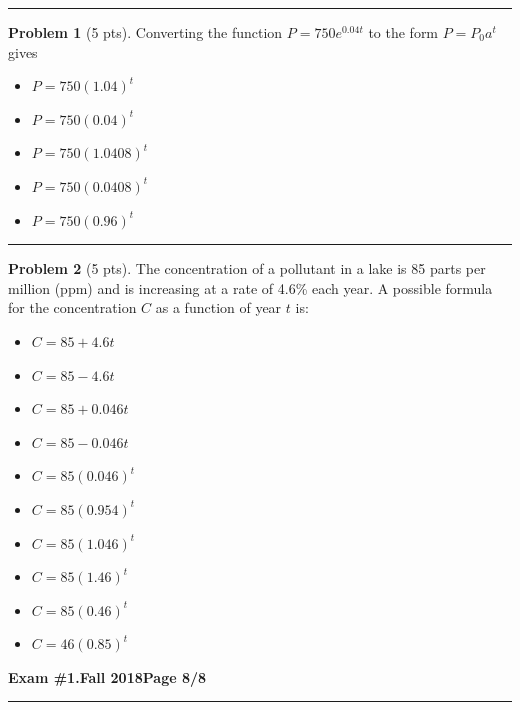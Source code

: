 \documentclass[12pt]{article}
\makeatletter
\theoremstyle{definition}
\newtheorem{problem}{Problem}
\newcommand*{\radiobutton}{%
  \@ifstar{\@radiobutton0}{\@radiobutton1}%
}
\newcommand*{\@radiobutton}[1]{%
  \begin{tikzpicture}
    \pgfmathsetlengthmacro\radius{height("X")/2}
    \draw[radius=\radius] circle;
    \ifcase#1 \fill[radius=.6*\radius] circle;\fi
  \end{tikzpicture}%
}
\makeatother
\begin{document}
\hrule

\begin{problem}[5 pts]
  Converting the function $P = 750e^{0.04t}$ to the form $P = P_0a^t$ gives
  \begin{itemize}
  \item[\radiobutton] $P = 750 (1.04)^t$
  \item[\radiobutton] $P = 750 (0.04)^t$
  \item[\radiobutton] $P = 750 (1.0408)^t$
  \item[\radiobutton] $P = 750 (0.0408)^t$
  \item[\radiobutton] $P = 750 (0.96)^t$
  \end{itemize}
\end{problem}
\hrule

\begin{problem}[5 pts]
  The concentration of a pollutant in a lake is 85 parts per million (ppm) and is increasing at a rate of 4.6\% each
  year. A possible formula for the concentration $C$ as a function of year $t$ is: 
  \begin{itemize}
  \item[\radiobutton] $C = 85 + 4.6t$
  \item[\radiobutton] $C = 85 - 4.6t$
  \item[\radiobutton] $C = 85 + 0.046t$
  \item[\radiobutton] $C = 85 - 0.046t$
  \item[\radiobutton] $C = 85(0.046)^t$
  \item[\radiobutton] $C = 85(0.954)^t$
  \item[\radiobutton] $C = 85(1.046)^t$
  \item[\radiobutton] $C = 85(1.46)^t$
  \item[\radiobutton] $C = 85(0.46)^t$
  \item[\radiobutton] $C = 46(0.85)^t$
  \end{itemize}
\end{problem}
\newpage

\hfill{\large\bf Exam \#1.}\hfill{\large\bf  Fall 2018}\hfill{\large\bf Page 8/8}\hrule
\end{document}
